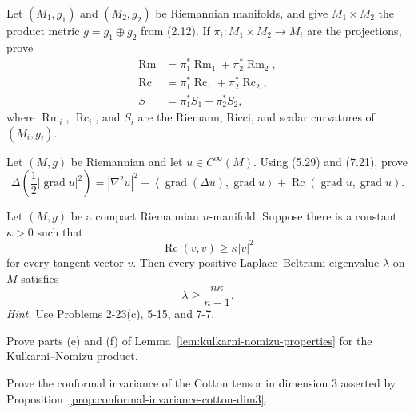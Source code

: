\begin{exercise}
\label{prob:product-metric-curvature}
Let $(M_1,g_1)$ and $(M_2,g_2)$ be Riemannian manifolds, and give
$M_1\times M_2$ the product metric $g=g_1\oplus g_2$ from (2.12). If
$\pi_i\colon M_1\times M_2\to M_i$ are the projections, prove
\begin{align*}
\operatorname{Rm}&=\pi_1^*\operatorname{Rm}_1+\pi_2^*\operatorname{Rm}_2,\\
\operatorname{Rc}&=\pi_1^*\operatorname{Rc}_1+\pi_2^*\operatorname{Rc}_2,\\
S&=\pi_1^*S_1+\pi_2^*S_2,
\end{align*}
where $\operatorname{Rm}_i$, $\operatorname{Rc}_i$, and $S_i$ are the Riemann,
Ricci, and scalar curvatures of $(M_i,g_i)$.
\end{exercise}

\begin{exercise}
\label{prob:bochner-formula}
Let $(M,g)$ be Riemannian and let $u\in C^\infty(M)$. Using (5.29) and
(7.21), prove
\[
\Delta\left(\frac12|\operatorname{grad}u|^2\right)
=|\nabla^2u|^2
+\left\langle\operatorname{grad}(\Delta u),\operatorname{grad}u\right\rangle
+\operatorname{Rc}(\operatorname{grad}u,\operatorname{grad}u).
\]
\end{exercise}

\begin{exercise}
\label{prob:lichnerowicz-theorem}
Let $(M,g)$ be a compact Riemannian $n$-manifold. Suppose there is a constant
$\kappa>0$ such that
\[
\operatorname{Rc}(v,v)\geq\kappa|v|^2
\]
for every tangent vector $v$. Then every positive Laplace--Beltrami eigenvalue
$\lambda$ on $M$ satisfies
\[
\lambda\geq\frac{n\kappa}{n-1}.
\]
\emph{Hint.} Use Problems 2-23(c), 5-15, and 7-7.
\end{exercise}

\begin{exercise}
\label{prob:kulkarni-nomizu-properties}
Prove parts (e) and (f) of
Lemma~\ref{lem:kulkarni-nomizu-properties} for the Kulkarni--Nomizu product.
\end{exercise}

\begin{exercise}
\label{prob:cotton-tensor-conformal}
Prove the conformal invariance of the Cotton tensor in dimension $3$ asserted
by Proposition~\ref{prop:conformal-invariance-cotton-dim3}.
\end{exercise}

